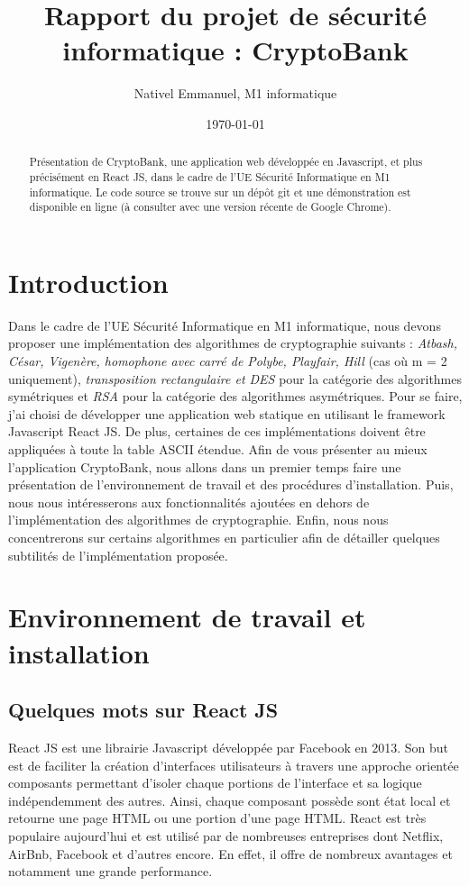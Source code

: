 \documentclass{article}
\title{Rapport du projet de sécurité informatique : CryptoBank}
\author{Nativel Emmanuel,  M1 informatique}
\date{\today}
\begin{document}
\maketitle %


\begin{abstract}
  Présentation de CryptoBank,  une application web développée en Javascript, et plus précisément en React JS, dans le cadre de l'UE Sécurité Informatique en M1 informatique. Le code source se trouve sur un dépôt git\cite{GitHub} et une démonstration est disponible en ligne\cite{site} (à consulter avec une version récente de Google Chrome).
\end{abstract}

\section{Introduction}
\label{section:introduction}

Dans le cadre de l'UE Sécurité Informatique en M1 informatique, nous devons proposer une implémentation des algorithmes de cryptographie suivants : \textit{Atbash, César, Vigenère, homophone avec carré de Polybe, Playfair, Hill} (cas où m = 2 uniquement), \textit{transposition rectangulaire et DES} pour la catégorie des algorithmes symétriques et \textit{RSA} pour la catégorie des algorithmes asymétriques. 
Pour se faire, j'ai choisi de développer une application web statique en utilisant le framework Javascript React JS\cite{react}. De plus, certaines de ces implémentations doivent être appliquées à toute la table ASCII étendue.
Afin de vous présenter au mieux l'application CryptoBank, nous allons dans un premier temps faire une présentation de l'environnement de travail et des procédures d'installation. Puis, nous nous intéresserons aux fonctionnalités ajoutées en dehors de l'implémentation des algorithmes de cryptographie. Enfin, nous nous concentrerons sur certains algorithmes en particulier afin de détailler quelques subtilités de l'implémentation proposée.

\section{Environnement de travail et installation}
\subsection{Quelques mots sur React JS}

React JS est une librairie Javascript développée par Facebook en 2013. Son but est de faciliter la création d'interfaces utilisateurs à travers une approche orientée composants permettant d'isoler chaque portions de l'interface et sa logique indépendemment des autres. Ainsi, chaque composant possède sont état local et retourne une page HTML ou une portion d'une page HTML. React est très populaire aujourd'hui et est utilisé par de nombreuses entreprises dont Netflix, AirBnb, Facebook et d'autres encore. En effet, il offre de nombreux avantages et notamment une grande performance. 
\end{document}
